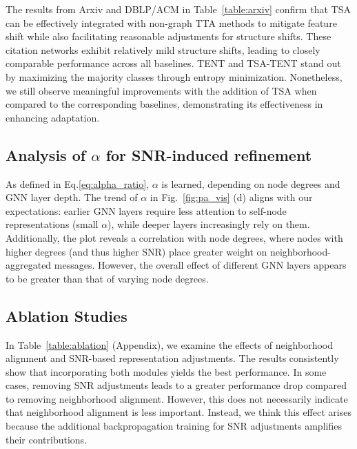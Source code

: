The results from Arxiv and DBLP/ACM in Table~\ref{table:arxiv} confirm that TSA can be effectively integrated with non-graph TTA methods to mitigate feature shift while also facilitating reasonable adjustments for structure shifts. These citation networks exhibit relatively mild structure shifts, leading to closely comparable performance across all baselines. TENT and TSA-TENT stand out by maximizing the majority classes through entropy minimization. Nonetheless, we still observe meaningful improvements with the addition of TSA when compared to the corresponding baselines, demonstrating its effectiveness in enhancing adaptation.







\subsection{Analysis of $\alpha$ for SNR-induced refinement}
\label{subsec:alpha}
As defined in Eq.\ref{eq:alpha_ratio}, $\alpha$ is learned, depending on node degrees and GNN layer depth. The trend of $\alpha$ in Fig.~\ref{fig:pa_vis} (d) aligns with our expectations: earlier GNN layers require less attention to self-node representations (small $\alpha$), while deeper layers increasingly rely on them. Additionally, the plot reveals a correlation with node degrees, where nodes with higher degrees (and thus higher SNR) place greater weight on neighborhood-aggregated messages. However, the overall effect of different GNN layers appears to be greater than that of varying node degrees. %

\subsection{Ablation Studies}
In Table~\ref{table:ablation} (Appendix), we examine the effects of neighborhood alignment and SNR-based representation adjustments. The results consistently show that incorporating both modules yields the best performance. In some cases, removing SNR adjustments leads to a greater performance drop compared to removing neighborhood alignment. However, this does not necessarily indicate that neighborhood alignment is less important. Instead, we think this effect arises because the additional backpropagation training for SNR adjustments amplifies their contributions. 

